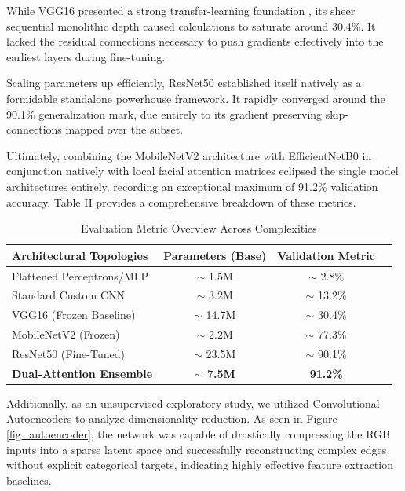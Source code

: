 \documentclass[conference]{IEEEtran}
\begin{document}
While VGG16 presented a strong transfer-learning foundation \cite{b12}, its sheer sequential monolithic depth caused calculations to saturate around 30.4\%. It lacked the residual connections necessary to push gradients effectively into the earliest layers during fine-tuning.

Scaling parameters up efficiently, ResNet50 \cite{b6} established itself natively as a formidable standalone powerhouse framework. It rapidly converged around the 90.1\% generalization mark, due entirely to its gradient preserving skip-connections mapped over the subset. 

Ultimately, combining the MobileNetV2 \cite{b5} architecture with EfficientNetB0 \cite{b7} in conjunction natively with local facial attention matrices eclipsed the single model architectures entirely, recording an exceptional maximum of 91.2\% validation accuracy. Table II provides a comprehensive breakdown of these metrics.

\begin{table}[htbp]
\caption{Evaluation Metric Overview Across Complexities}
\begin{center}
\begin{tabular}{|l|c|c|c|}
\hline
\textbf{Architectural Topologies} & \textbf{Parameters (Base)} & \textbf{Validation Metric} \\
\hline
Flattened Perceptrons/MLP & $\sim$ 1.5M & $\sim$ 2.8\% \\
Standard Custom CNN & $\sim$ 3.2M & $\sim$ 13.2\% \\
VGG16 (Frozen Baseline) & $\sim$ 14.7M & $\sim$ 30.4\% \\
MobileNetV2 (Frozen) & $\sim$ 2.2M & $\sim$ 77.3\% \\
ResNet50 (Fine-Tuned) & $\sim$ 23.5M & $\sim$ 90.1\% \\
\textbf{Dual-Attention Ensemble} & \textbf{$\sim$ 7.5M} & \textbf{91.2\%} \\
\hline
\end{tabular}
\label{tab_results}
\end{center}
\end{table}

Additionally, as an unsupervised exploratory study, we utilized Convolutional Autoencoders to analyze dimensionality reduction. As seen in Figure \ref{fig_autoencoder}, the network was capable of drastically compressing the RGB inputs into a sparse latent space and successfully reconstructing complex edges without explicit categorical targets, indicating highly effective feature extraction baselines.
\end{document}
